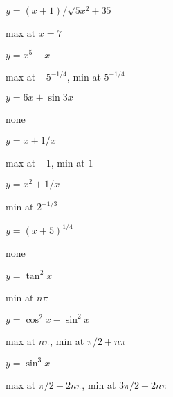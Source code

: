 \begin{exercises}
\begin{exercise} $y = (x+1)/\sqrt{5x^2 + 35}$
\begin{answer} max at $x=7$
\end{answer}\end{exercise}

\begin{exercise} $y= x^5 - x$
\begin{answer} max at $-5^{-1/4}$, min at $5^{-1/4}$
\end{answer}\end{exercise}

\begin{exercise} $y = 6x +\sin 3x$
\begin{answer} none
\end{answer}\end{exercise}

\begin{exercise} $y = x+ 1/x$
\begin{answer} max at $-1$, min at $1$
\end{answer}\end{exercise}

\begin{exercise} $y = x^2+ 1/x$
\begin{answer} min at $2^{-1/3}$
\end{answer}\end{exercise}

\begin{exercise} $y = (x+5)^{1/4}$
\begin{answer} none
\end{answer}\end{exercise}

\begin{exercise} $y = \tan^2 x$
\begin{answer} min at $n\pi$
\end{answer}\end{exercise}

\begin{exercise} $y =\cos^2 x - \sin^2 x$
\begin{answer} max at $n\pi$, min at $\pi/2+n\pi$
\end{answer}\end{exercise}

\begin{exercise} $y = \sin^3 x$
\begin{answer} max at $\pi/2+2n\pi$, min at $3\pi/2+2n\pi$
\end{answer}\end{exercise}

\endtwocol
\end{exercises}

